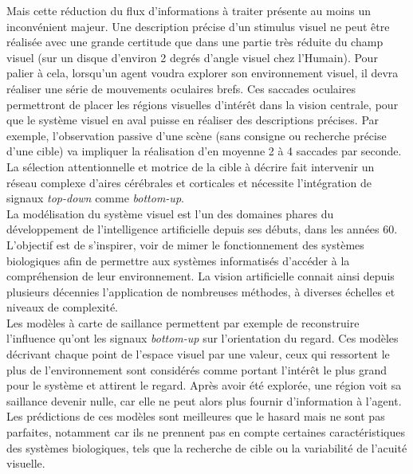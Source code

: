 Mais cette réduction du flux d'informations à traiter présente au moins un inconvénient majeur. 
Une description précise d'un stimulus visuel ne peut être réalisée avec une grande certitude que dans une partie très réduite du champ visuel (sur un disque d'environ 2 degrés d'angle visuel chez l'Humain).
Pour palier à cela, lorsqu'un agent voudra explorer son environnement visuel, il devra réaliser une série de mouvements oculaires brefs. Ces saccades oculaires permettront de placer les régions visuelles d'intérêt dans la vision centrale, pour que le système visuel en aval puisse en réaliser des descriptions précises. Par exemple, l'observation passive d'une scène (sans consigne ou recherche précise d'une cible) va impliquer la réalisation d'en moyenne 2 à 4 saccades par seconde. \autocite{Krauzlis2017, Werner2014} \\
La sélection attentionnelle et motrice de la cible à décrire fait intervenir un réseau complexe d'aires cérébrales et corticales et nécessite l'intégration de signaux \textit{top-down} comme \textit{bottom-up}. \autocite{Werner2014} \\


La modélisation du système visuel est l'un des domaines phares du développement de l'intelligence artificielle depuis ses débuts, dans les années 60.
L'objectif est de s'inspirer, voir de mimer le fonctionnement des systèmes biologiques afin de permettre aux systèmes informatisés d'accéder à la compréhension de leur environnement.
La vision artificielle connait ainsi depuis plusieurs décennies l'application de nombreuses méthodes, à diverses échelles et niveaux de complexité.\autocite{Werner2014} \\
Les modèles à carte de saillance permettent par exemple de reconstruire l'influence qu'ont les signaux \textit{bottom-up} sur l'orientation du regard. 
Ces modèles décrivant chaque point de l'espace visuel par une valeur, ceux qui ressortent le plus de l'environnement sont considérés comme portant l'intérêt le plus grand pour le système et attirent le regard. 
Après avoir été explorée, une région voit sa saillance devenir nulle, car elle ne peut alors plus fournir d'information à l'agent.
Les prédictions de ces modèles sont meilleures que le hasard mais ne sont pas parfaites, notamment car ils ne prennent pas en compte certaines caractéristiques des systèmes biologiques, tels que la recherche de cible ou la variabilité de l'acuité visuelle. \autocite{Werner2014} \\

